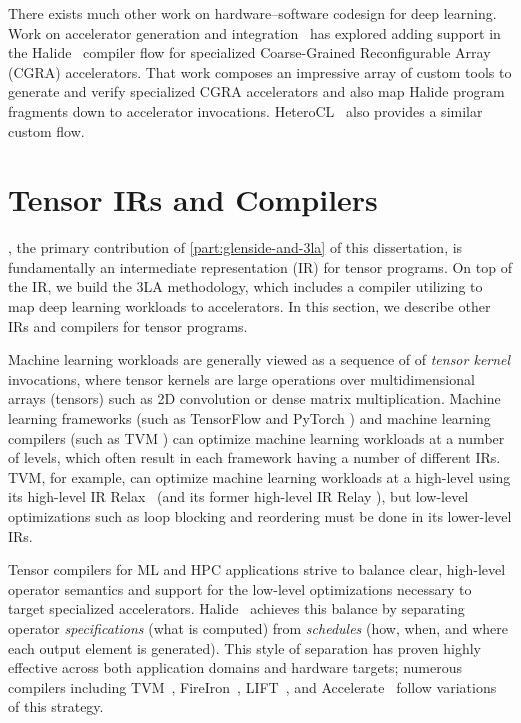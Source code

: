 There exists much other work on
  hardware--software codesign
  for deep learning.
Work on accelerator generation and integration~\cite{
    bahr2020creating, truong2020fault}
  has explored adding support in the Halide~\cite{ragan2013halide}
  compiler flow for specialized Coarse-Grained Reconfigurable Array (CGRA) accelerators.
That work composes an
  impressive array of custom tools to
  generate and verify specialized CGRA accelerators
  and also map Halide program fragments
  down to accelerator invocations.
HeteroCL~\cite{lai2019heterocl} also provides
  a similar custom flow.


\section{Tensor IRs and Compilers}

\g, the primary contribution
  of \cref{part:glenside-and-3la}
  of this dissertation,
  is fundamentally an
  intermediate representation (IR)
  for tensor programs.
On top of the \g IR,
  we build the 3LA methodology,
  which includes a compiler
  utilizing \g
  to map deep learning workloads
  to accelerators.
In this section, we describe
  other IRs and compilers
  for tensor programs.

Machine learning workloads
 are generally viewed
 as a sequence of 
 of \textit{tensor kernel} invocations,
 where tensor kernels
 are large operations
 over multidimensional arrays (tensors)
 such as 2D convolution
 or dense matrix multiplication.
Machine learning frameworks
 (such as TensorFlow \cite{abadi2016tensorflow}
   and PyTorch \cite{pytorch})
 and machine learning compilers
 (such as TVM \cite{chen2018tvm})
 can optimize
 machine learning workloads
 at a number of levels,
 which often result
 in each framework
 having a number of different IRs.
TVM, for example,
 can optimize machine learning workloads
 at a high-level
 using its high-level IR
 Relax~\cite{lai2023relaxcomposableabstractionsendtoend}
 (and its former high-level
   IR Relay \cite{relay}),
 but
 low-level optimizations
 such as loop blocking and reordering
 must be done 
 in its lower-level IRs.


Tensor compilers for ML and HPC applications strive
  to balance clear, high-level operator semantics
  and support for the low-level optimizations
  necessary to target specialized accelerators.
Halide~\cite{halide}
  achieves this balance by separating
  operator \textit{specifications} (what is computed) from
  \textit{schedules} (how, when, and where
  each output element is generated).
This style of separation has proven
  highly effective across both
  application domains and hardware targets;
  numerous compilers including TVM~\cite{chen2018tvm},
  FireIron~\cite{hagedorn2020fireiron},
  LIFT~\cite{lift}, and Accelerate~\cite{accelerate}
  follow variations of this strategy.
  
